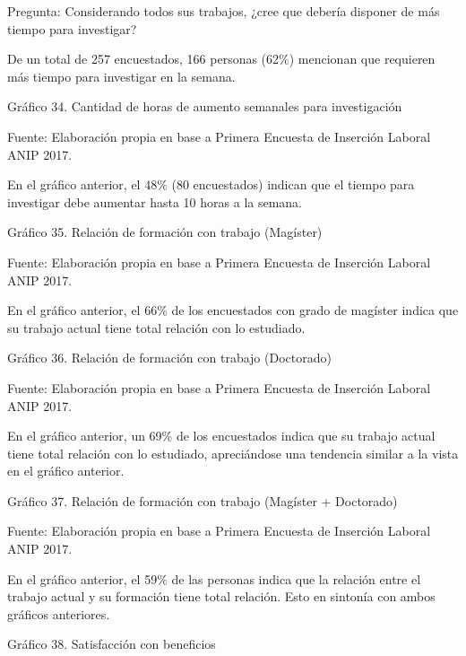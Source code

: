 \documentclass{article}
\begin{document}
Pregunta: Considerando todos sus trabajos, ¿cree que debería disponer de más tiempo para investigar? 


De un total de 257 encuestados, 166 personas (62\%) mencionan que requieren más tiempo para investigar en la semana.

Gráfico 34. Cantidad de horas de aumento semanales para investigación


Fuente: Elaboración propia en base a Primera Encuesta de Inserción Laboral ANIP 2017.

En el gráfico anterior, el 48\% (80 encuestados) indican que el tiempo para investigar debe aumentar hasta 10 horas a la semana.

Gráfico 35. Relación de formación con trabajo (Magíster)


Fuente: Elaboración propia en base a Primera Encuesta de Inserción Laboral ANIP 2017.

En el gráfico anterior, el 66\% de los encuestados con grado de magíster indica que su trabajo actual tiene total relación con lo estudiado.

Gráfico 36. Relación de formación con trabajo (Doctorado)


Fuente: Elaboración propia en base a Primera Encuesta de Inserción Laboral ANIP 2017.

En el gráfico anterior, un 69\% de los encuestados indica que su trabajo actual tiene total relación con lo estudiado, apreciándose una tendencia similar a la vista en el gráfico anterior.

Gráfico 37. Relación de formación con trabajo (Magíster + Doctorado)



Fuente: Elaboración propia en base a Primera Encuesta de Inserción Laboral ANIP 2017.

En el gráfico anterior, el 59\% de las personas indica que la relación entre el trabajo actual y su formación tiene total relación. Esto en sintonía con ambos gráficos anteriores.

Gráfico 38. Satisfacción con beneficios

\end{document}
